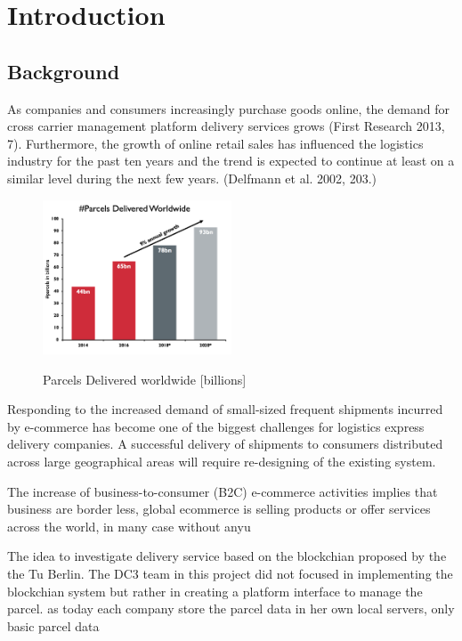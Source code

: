 \chapter{Introduction}
\label{cha:introduction}


\section{Background}

As companies and consumers increasingly purchase goods online, the demand for cross carrier management platform
delivery services grows (First Research 2013, 7). Furthermore, the growth of online retail
sales has influenced the logistics industry for the past ten years and the trend is expected to
continue at least on a similar level during the next few years. (Delfmann et al. 2002, 203.) 

\begin{figure}[!ht]
	\centering
	\includegraphics[width=0.5\textwidth]{images/ParcelsDel.png}\\
	\caption{Parcels Delivered worldwide [billions]}
	\label{fig:introduction__loremipsum}
\end{figure}

Responding to the increased demand of small-sized frequent shipments incurred by e-commerce has become one of the biggest challenges for logistics express delivery companies.
A successful delivery of shipments to consumers distributed across large geographical areas
will require re-designing of the existing system.

The increase of business-to-consumer (B2C) e-commerce activities implies that business are border less, global ecommerce is selling products or offer services across the world, in many case without anyu


The idea to investigate delivery service based on the  blockchian proposed by the the Tu Berlin. The DC3 team in this project did not focused in implementing the blockchian system but rather in creating a platform interface to manage the parcel. as today each company store the parcel data in her own local servers, only basic parcel data    






